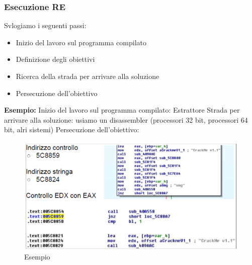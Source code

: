 \documentclass{article}
\begin{document}
\subsubsection{Esecuzione RE}
Svlogiamo i seguenti passi:
\begin{itemize}
    \item Inizio del lavoro sul programma compilato
    \item Definizione degli obiettivi
    \item Ricerca della strada per arrivare alla soluzione
    \item Persecuzione dell’obiettivo
\end{itemize}
\textbf{Esempio:} Inizio del lavoro sul programma compilato: Estrattore Strada per arrivare alla 
soluzione: usiamo un disassembler (processori 32 bit, processori 64 bit, alri sistemi) Persecuzione 
dell’obiettivo:
\begin{figure}[H]
    \center
    \includegraphics[scale=0.4]{images/RCE2.png}
    \caption{Esempio}\label{fig:1}
\end{figure}
\end{document}

